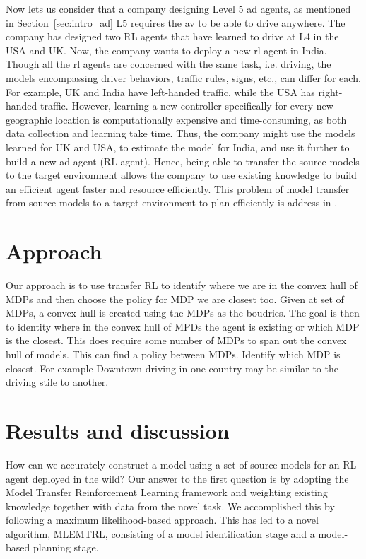Now lets us consider that a company designing Level 5 \gls{ad} agents, as mentioned in Section~\ref{sec:intro_ad} L5 requires the \gls{av} to be able to drive anywhere. The company has designed two RL agents that have learned to drive at L4 in the USA and UK. Now, the company wants to deploy a new \gls{rl} agent in India. 
Though all the \gls{rl} agents are concerned with the same task, i.e. driving, the models encompassing driver behaviors, traffic rules, signs, etc., can differ for each. For example, UK and India have left-handed traffic, while the USA has right-handed traffic. However, learning a new controller specifically for every new geographic location is computationally expensive and time-consuming, as both data collection and learning take time. Thus, the company might use the models learned for UK and USA, to estimate the model for India, and use it further to build a new \gls{ad} agent (RL agent). Hence, being able to transfer the source models to the target environment allows the company to use existing knowledge to build an efficient agent faster and resource efficiently. This problem of model transfer from source models to a target environment to plan efficiently is address in \paperTransfer.

\section{Approach}
Our approach is to use transfer RL to identify where we are in the convex hull of MDPs and then choose the policy for MDP we are closest too. 
Given at set of MDPs, a convex hull is created using the MDPs as the boudries. The goal is then to identity where in the convex hull of MPDs the agent is existing or which MDP is the closest. 
This does require some number of MDPs to span out the convex hull of models. 
This can find a policy between MDPs. 
Identify which MDP is closest. For example Downtown driving in one country may be similar to the driving stile to another. 


\section{Results and discussion}
How can we accurately construct a model using a set of source models for an RL agent deployed in the wild?
Our answer to the first question is by adopting the Model Transfer Reinforcement Learning framework and weighting existing knowledge together with data from the novel task. We accomplished this by following a maximum likelihood-based approach. This has led to a novel algorithm, MLEMTRL, consisting of a model identification stage and a model-based planning stage.

